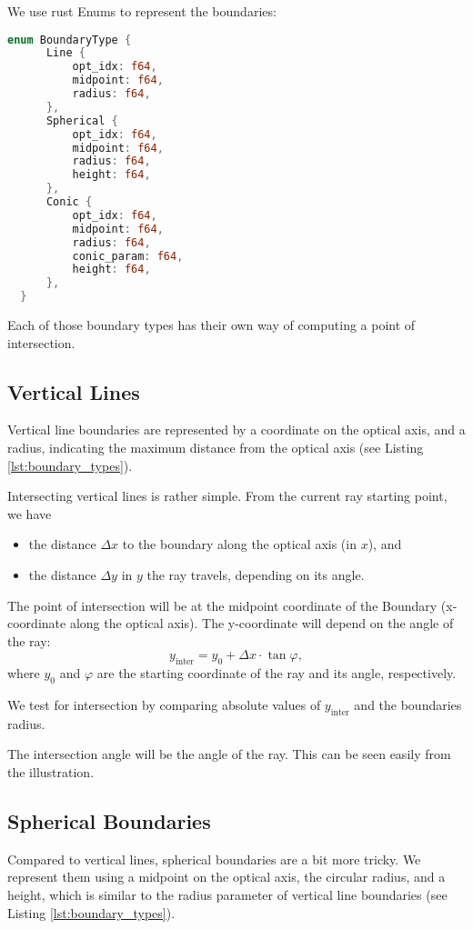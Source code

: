 \documentclass[12pt]{article}
\begin{document}
We use rust Enums to represent the boundaries:
\begin{lstlisting}[caption={Representation of Boundary Types\label{lst:boundary_types}},language=Rust]
  enum BoundaryType {
      Line {
          opt_idx: f64,
          midpoint: f64,
          radius: f64,
      },
      Spherical {
          opt_idx: f64,
          midpoint: f64,
          radius: f64,
          height: f64,
      },
      Conic {
          opt_idx: f64,
          midpoint: f64,
          radius: f64,
          conic_param: f64,
          height: f64,
      },
  }
\end{lstlisting}

Each of those boundary types has their own way of computing a point of intersection.

\clearpage
\subsection{Vertical Lines}
Vertical line boundaries are represented by a coordinate on the optical axis, and a
radius, indicating the maximum distance from the optical axis (see Listing 
\ref{lst:boundary_types}).

Intersecting vertical lines is rather simple. From the current ray starting point, we
have
\begin{itemize}
  \item the distance $\Delta x$ to the boundary along the optical axis (in $x$), and
  \item the distance $\Delta y$ in $y$ the ray travels, depending on its angle.
\end{itemize}
The point of intersection will be at the midpoint coordinate of the Boundary
(x-coordinate along the optical axis). The y-coordinate will depend on the angle of the
ray:
$$y_\text{inter} = y_0 + \Delta x \cdot \tan{\varphi},$$
where $y_0$ and $\varphi$ are the starting coordinate of the ray and its angle,
respectively. 

We test for intersection by comparing absolute values of $y_\text{inter}$ and the
boundaries radius.

The intersection angle will be the angle of the ray. This can be seen easily from the
illustration.

\clearpage
\subsection{Spherical Boundaries}
Compared to vertical lines, spherical boundaries are a bit more tricky. We represent them
using a midpoint on the optical axis, the circular radius, and a height, which is similar
to the radius parameter of vertical line boundaries (see Listing
\ref{lst:boundary_types}).
\end{document}
